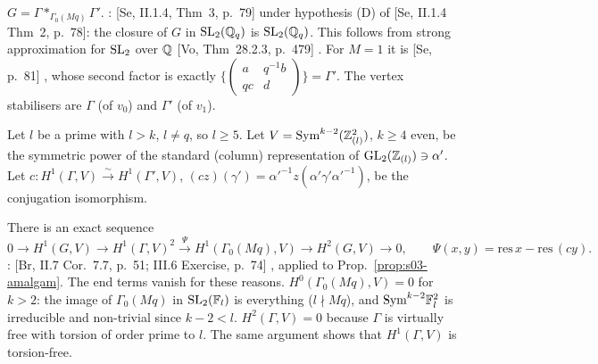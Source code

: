 \begin{proposition}[amalgam]\label{prop:s03-amalgam}
$G=\Gamma*_{\Gamma_0(Mq)}\Gamma'$. \stpmc: [Se, II.1.4, Thm~3, p.~79]  under
hypothesis (D) of [Se, II.1.4 Thm~2, p.~78]: the closure of $G$ in $\mathrm{SL}_2(\mathbb{Q}_q)$ is $\mathrm{SL}_2(\mathbb{Q}_q)$. This follows from strong
approximation for $\mathrm{SL}_2$ over $\mathbb{Q}$ [Vo, Thm~28.2.3, p.~479] . For
$M=1$ it is [Se, p.~81] \stcited, whose second factor is exactly $\{(\begin{smallmatrix}a&q^{-1}b\\qc&d\end{smallmatrix})\}=\Gamma'$.
The vertex stabilisers are $\Gamma$ (of $v_0$) and $\Gamma'$ (of $v_1$).
\end{proposition}

Let $l$ be a prime with $l>k$, $l\ne q$, so $l\ge5$. Let $V=\mathrm{Sym}^{k-2}(\mathbb{Z}_{(l)}^2)$, $k\ge4$ even, be the symmetric power of the
standard (column) representation of $\mathrm{GL}_2(\mathbb{Z}_{(l)})\ni\alpha'$. Let $c:H^1(\Gamma,V)\xrightarrow\sim H^1(\Gamma',V)$,
$(cz)(\gamma')=\alpha'^{-1}z(\alpha'\gamma'\alpha'^{-1})$, be the conjugation isomorphism.

\begin{proposition}\label{prop:s03-MV}
There is an exact sequence
\[0\to H^1(G,V)\to H^1(\Gamma,V)^2\xrightarrow{\ \Psi\ }H^1(\Gamma_0(Mq),V)\to H^2(G,V)\to0,\qquad \Psi(x,y)=\mathrm{res}\,x-\mathrm{res}\,(cy).\]
\stpmc: [Br, II.7 Cor.~7.7, p.~51; III.6 Exercise, p.~74] 
\stcited, applied to Prop.~\ref{prop:s03-amalgam}. The end terms vanish for these reasons. $H^0(\Gamma_0(Mq),V)=0$ for $k>2$: the
image of $\Gamma_0(Mq)$ in $\mathrm{SL}_2(\mathbb{F}_l)$ is everything ($l\nmid Mq$), and $\mathrm{Sym}^{k-2}\mathbb{F}_l^2$ is irreducible and non-trivial since
$k-2<l$. $H^2(\Gamma,V)=0$ because $\Gamma$ is virtually free with torsion of order prime to $l$. The same argument shows that
$H^1(\Gamma,V)$ is torsion-free.
\end{proposition}

